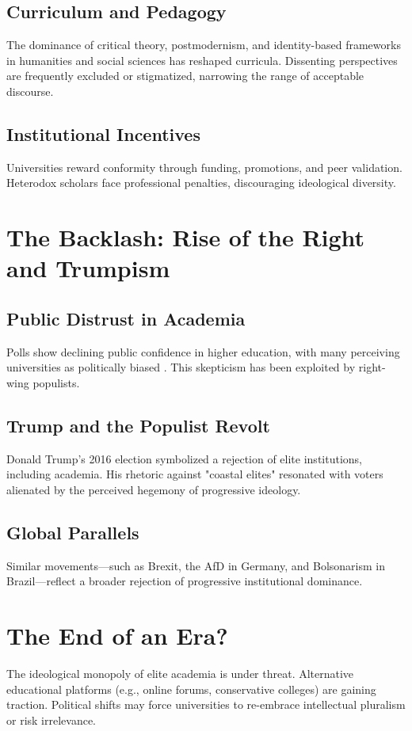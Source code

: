 \documentclass[11pt]{article}
\begin{document}
\subsection{Curriculum and Pedagogy}
The dominance of critical theory, postmodernism, and identity-based frameworks in humanities and social sciences has reshaped curricula. Dissenting perspectives are frequently excluded or stigmatized, narrowing the range of acceptable discourse.

\subsection{Institutional Incentives}
Universities reward conformity through funding, promotions, and peer validation. Heterodox scholars face professional penalties, discouraging ideological diversity.

\section{The Backlash: Rise of the Right and Trumpism}
\subsection{Public Distrust in Academia}
Polls show declining public confidence in higher education, with many perceiving universities as politically biased \cite{Pew2019}. This skepticism has been exploited by right-wing populists.

\subsection{Trump and the Populist Revolt}
Donald Trump’s 2016 election symbolized a rejection of elite institutions, including academia. His rhetoric against "coastal elites" resonated with voters alienated by the perceived hegemony of progressive ideology.

\subsection{Global Parallels}
Similar movements—such as Brexit, the AfD in Germany, and Bolsonarism in Brazil—reflect a broader rejection of progressive institutional dominance.

\section{The End of an Era?}
The ideological monopoly of elite academia is under threat. Alternative educational platforms (e.g., online forums, conservative colleges) are gaining traction. Political shifts may force universities to re-embrace intellectual pluralism or risk irrelevance.
\end{document}
